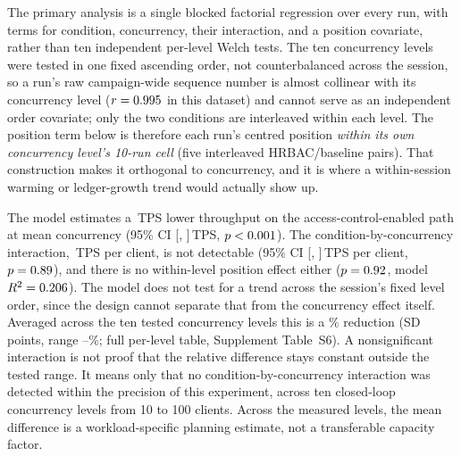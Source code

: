 \documentclass[a4paper,fleqn]{cas-dc}
\begin{document}
The primary analysis is a single blocked factorial regression over every
run, with terms for condition, concurrency, their interaction, and a
position covariate, rather than ten independent per-level Welch tests. The
ten concurrency levels were tested in one fixed ascending order, not
counterbalanced across the session, so a run's raw campaign-wide sequence
number is almost collinear with its concurrency level
($r=0.995$ in this dataset) and cannot serve as an
independent order covariate; only the two conditions are interleaved within
each level. The position term below is therefore each run's centred
position \emph{within its own concurrency level's 10-run cell} (five
interleaved HRBAC/baseline pairs). That construction makes it orthogonal to
concurrency, and it is where a within-session warming or ledger-growth
trend would actually show up.

The model estimates a \ThrCondCoef\,TPS lower throughput on the
access-control-enabled path at mean concurrency (95\% CI
[\ThrCondCoefCILow, \ThrCondCoefCIHigh]\,TPS, $p<0.001$). The
condition-by-concurrency interaction, \ThrInteractCoef\,TPS per client, is
not detectable (95\% CI [\ThrInteractCILow, \ThrInteractCIHigh]\,TPS per
client, $p=0.89$), and there is no within-level position effect
either ($p=0.92$, model $R^2=0.206$). The model does
not test for a trend across the session's fixed level order, since the
design cannot separate that from the concurrency effect itself. Averaged
across the ten tested concurrency levels this is a \OverheadMeanPct\%
reduction (SD \OverheadSDPct{} points, range
\OverheadMinPct--\OverheadMaxPct\%; full per-level table, Supplement
Table~S6). A nonsignificant interaction is not proof that the relative
difference stays constant outside the tested range. It means only that no
condition-by-concurrency interaction was detected within the precision of
this experiment, across ten closed-loop concurrency levels from 10 to 100
clients. Across the measured levels, the mean difference is a
workload-specific planning estimate, not a transferable capacity factor.
\end{document}
